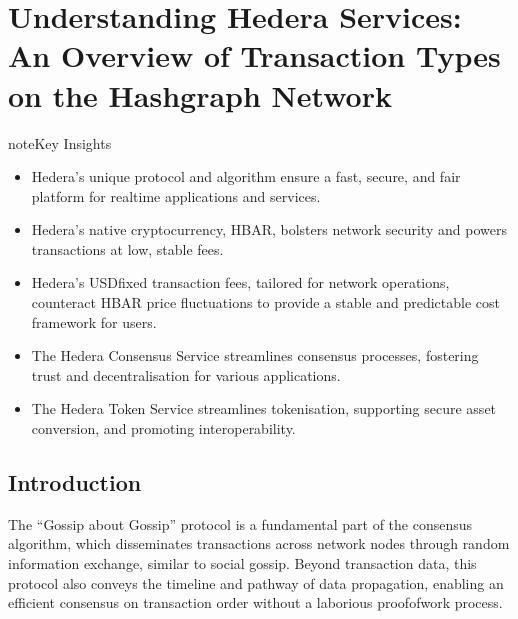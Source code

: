 \documentclass[letterpaper,10pt,english]{jupyterBook}
\begin{document}
\section{Understanding Hedera Services: An Overview of Transaction Types on the Hashgraph Network}
\label{\detokenize{HED/hed:understanding-hedera-services-an-overview-of-transaction-types-on-the-hashgraph-network}}\label{\detokenize{HED/hed::doc}}


\sphinxAtStartPar
{}

\begin{sphinxadmonition}{note}{Key Insights}
\begin{itemize}
\item {} 
\sphinxAtStartPar
Hedera’s unique protocol and algorithm ensure a fast, secure, and fair platform for real\sphinxhyphen{}time applications and services.

\item {} 
\sphinxAtStartPar
Hedera’s native cryptocurrency, HBAR, bolsters network security and powers transactions at low, stable fees.

\item {} 
\sphinxAtStartPar
Hedera’s USD\sphinxhyphen{}fixed transaction fees, tailored for network operations, counteract HBAR price fluctuations to provide a stable and predictable cost framework for users.

\item {} 
\sphinxAtStartPar
The Hedera Consensus Service streamlines consensus processes, fostering trust and decentralisation for various applications.

\item {} 
\sphinxAtStartPar
The Hedera Token Service streamlines tokenisation, supporting secure asset conversion, and promoting interoperability.

\end{itemize}
\end{sphinxadmonition}


\subsection{Introduction}
\label{\detokenize{HED/hed:introduction}}
\begin{sphinxShadowBox}

\sphinxAtStartPar
The “Gossip about Gossip” protocol is a fundamental part of the consensus algorithm, which disseminates transactions across network nodes through random information exchange, similar to social gossip. Beyond transaction data, this protocol also conveys the timeline and pathway of data propagation, enabling an efficient consensus on transaction order without a laborious proof\sphinxhyphen{}of\sphinxhyphen{}work process.
\end{sphinxShadowBox}
\end{document}
